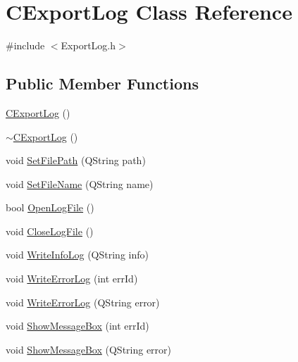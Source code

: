 \hypertarget{classCExportLog}{
\section{CExportLog Class Reference}
\label{classCExportLog}
}


{\ttfamily \#include $<$ExportLog.h$>$}\subsection*{Public Member Functions}
\begin{DoxyCompactItemize}
\item 
\hyperlink{classCExportLog_a9025e661ea014b4e9b84ec7507d1fce1}{CExportLog} ()
\item 
\hyperlink{classCExportLog_a1dd4f328cf5efec31bf0a06e3d1ece0d}{$\sim$CExportLog} ()
\item 
void \hyperlink{classCExportLog_a72fbcc722def244634996c0a4c7ae7dd}{SetFilePath} (QString path)
\item 
void \hyperlink{classCExportLog_aeaa6ab60ed0b4cad6b465f309da5d6b2}{SetFileName} (QString name)
\item 
bool \hyperlink{classCExportLog_ac5b1e09dd67f6aaa199f6ff98c0e1138}{OpenLogFile} ()
\item 
void \hyperlink{classCExportLog_a693e8f83ac60f696f88358e8c907f316}{CloseLogFile} ()
\item 
void \hyperlink{classCExportLog_a98759c11a550a90692af1fc21fc58c64}{WriteInfoLog} (QString info)
\item 
void \hyperlink{classCExportLog_aedda889f4345c0fb94691fe20eee643f}{WriteErrorLog} (int errId)
\item 
void \hyperlink{classCExportLog_ad316dacdee3ef0fb2ee34e17b56743ca}{WriteErrorLog} (QString error)
\item 
void \hyperlink{classCExportLog_af21ab4e7ccfcc193bbb6cfe48afb8a44}{ShowMessageBox} (int errId)
\item 
void \hyperlink{classCExportLog_a3cab18e4b751b54e26ad62c60c71ec93}{ShowMessageBox} (QString error)
\end{DoxyCompactItemize}
